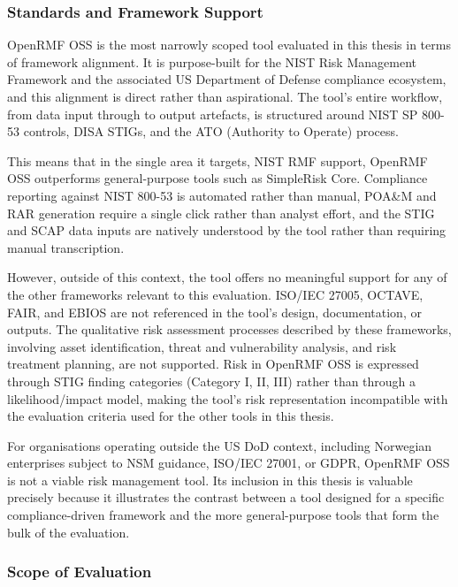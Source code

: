 \subsubsection{Standards and Framework Support}
OpenRMF OSS is the most narrowly scoped tool evaluated in this thesis in terms of
framework alignment. It is purpose-built for the NIST Risk Management Framework and
the associated US Department of Defense compliance ecosystem, and this alignment is
direct rather than aspirational. The tool's entire workflow, from data input through
to output artefacts, is structured around NIST SP 800-53 controls, DISA STIGs, and
the ATO (Authority to Operate) process.
 
This means that in the single area it targets, NIST RMF support, OpenRMF OSS
outperforms general-purpose tools such as SimpleRisk Core. Compliance reporting
against NIST 800-53 is automated rather than manual, POA\&M and RAR generation
require a single click rather than analyst effort, and the STIG and SCAP data inputs
are natively understood by the tool rather than requiring manual transcription.
 
However, outside of this context, the tool offers no meaningful support for any of
the other frameworks relevant to this evaluation. ISO/IEC 27005, OCTAVE, FAIR, and
EBIOS are not referenced in the tool's design, documentation, or outputs. The
qualitative risk assessment processes described by these frameworks, involving asset
identification, threat and vulnerability analysis, and risk treatment planning, are
not supported. Risk in OpenRMF OSS is expressed through STIG finding categories
(Category I, II, III) rather than through a likelihood/impact model, making the
tool's risk representation incompatible with the evaluation criteria used for the
other tools in this thesis.
 
For organisations operating outside the US DoD context, including Norwegian
enterprises subject to NSM guidance, ISO/IEC 27001, or GDPR, OpenRMF OSS is not
a viable risk management tool. Its inclusion in this thesis is valuable precisely
because it illustrates the contrast between a tool designed for a specific
compliance-driven framework and the more general-purpose tools that form the bulk
of the evaluation. 

\subsubsection{Scope of Evaluation}
\label{sec:openrmf-no-scenario}

